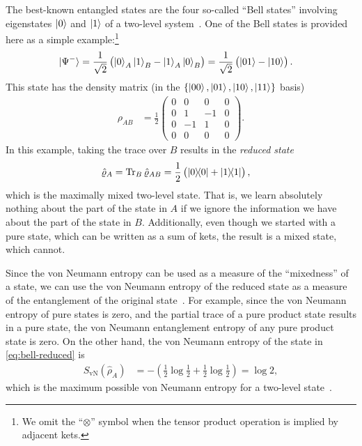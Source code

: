 The best-known entangled states are the four so-called ``Bell states'' involving eigenstates $\ket{0}$ and $\ket{1}$ of a two-level system~\cite[88]{wilde2013quantum}.
One of the Bell states is provided here as a simple example:\footnote{
	We omit the ``$\otimes$'' symbol when the tensor product operation is implied by adjacent kets.
}
\begin{align}
	\ket{\Psi^-}
	&= \frac{1}{\sqrt{2}} \left( \ket{0}_A \ket{1}_B - \ket{1}_A \ket{0}_B \right)
	= \frac{1}{\sqrt{2}} \left( \ket{01} - \ket{10} \right).
\end{align}
This state has the density matrix (in the $\{ \ket{00}, \ket{01}, \ket{10}, \ket{11} \}$ basis)
\begin{align}
	\rho_{AB}
	&= \frac{1}{2} \begin{pmatrix}
			0 & 0 & 0 & 0 \\
			0 & 1 & -1 & 0 \\
			0 & -1 & 1 & 0 \\
			0 & 0 & 0 & 0
		\end{pmatrix}.
\end{align}
In this example, taking the trace over $B$ results in the \emph{reduced state}
\begin{align}
	\hat{\varrho}_A
	&= \operatorname{Tr}_B{\hat{\varrho}_{AB}}
	= \frac{1}{2} \left( \ket{0}\!\!\bra{0} + \ket{1}\!\!\bra{1} \right),
		\label{eq:bell-reduced}
\end{align}
which is the maximally mixed two-level state.
That is, we learn absolutely nothing about the part of the state in $A$ if we ignore the information we have about the part of the state in $B$.
Additionally, even though we started with a pure state, which can be written as a sum of kets, the result is a mixed state, which cannot.

Since the von Neumann entropy can be used as a measure of the ``mixedness'' of a state, we can use the von Neumann entropy of the reduced state as a measure of the entanglement of the original state~\cite{schumacher1995quantum,vedral1997quantifying}.
For example, since the von Neumann entropy of pure states is zero, and the partial trace of a pure product state results in a pure state, the von Neumann entanglement entropy of any pure product state is zero.
On the other hand, the von Neumann entropy of the state in \cref{eq:bell-reduced} is
\begin{align}
	S_\mathrm{vN}(\hat{\rho}_A)
	&= -\left( \frac{1}{2} \log{\frac{1}{2}} + \frac{1}{2} \log{\frac{1}{2}} \right)
	= \log{2},
\end{align}
which is the maximum possible von Neumann entropy for a two-level state~\cite[255]{wilde2013quantum}.

